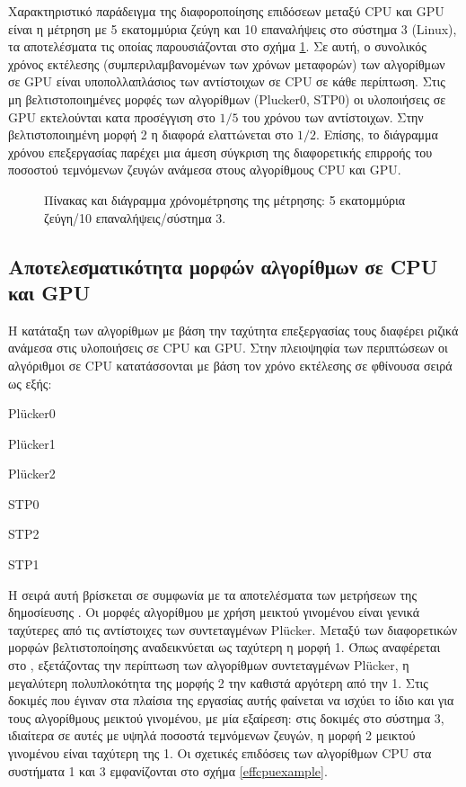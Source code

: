 Χαρακτηριστικό παράδειγμα της διαφοροποίησης επιδόσεων μεταξύ CPU και GPU είναι η μέτρηση με 5 εκατομμύρια ζεύγη και 10 επαναλήψεις στο σύστημα 3 (Linux), τα αποτελέσματα τις οποίας παρουσιάζονται στο σχήμα \ref{gpuexample}. Σε αυτή, ο συνολικός χρόνος εκτέλεσης (συμπεριλαμβανομένων των χρόνων μεταφορών) των αλγορίθμων σε GPU είναι υποπολλαπλάσιος των αντίστοιχων σε CPU σε κάθε περίπτωση. Στις μη βελτιστοποιημένες μορφές των αλγορίθμων (Plucker0, STP0) οι υλοποιήσεις σε GPU εκτελούνται κατα προσέγγιση στο $1/5$ του χρόνου των αντίστοιχων. Στην βελτιστοποιημένη μορφή 2 η διαφορά ελαττώνεται στο $1/2$. Επίσης, το διάγραμμα χρόνου επεξεργασίας παρέχει μια άμεση σύγκριση της διαφορετικής επιρροής του ποσοστού τεμνόμενων ζευγών ανάμεσα στους αλγορίθμους CPU και GPU.

\begin{figure}[b]
\begin{center}
\tabcolsep=0.11cm
\scalebox{0.6}{}
\scalebox{0.9}{
}\end{center}
\caption{Πίνακας και διάγραμμα χρόνομέτρησης της μέτρησης: 5 εκατομμύρια ζεύγη/10 επαναλήψεις/σύστημα 3.}
\label{gpuexample}
\end{figure}

\subsection{Αποτελεσματικότητα μορφών αλγορίθμων σε CPU και GPU}
\label{chapter:bench_algs}
\noindent Η κατάταξη των αλγορίθμων με βάση την ταχύτητα επεξεργασίας τους διαφέρει ριζικά ανάμεσα στις υλοποιήσεις σε CPU και GPU. Στην πλειοψηφία των περιπτώσεων οι αλγόριθμοι σε CPU κατατάσσονται με βάση τον χρόνο εκτέλεσης σε φθίνουσα σειρά ως εξής:

\begin{enumerate*}
\item Plücker0
\item Plücker1
\item Plücker2
\item STP0
\item STP2
\item STP1
\end{enumerate*}

Η σειρά αυτή βρίσκεται σε συμφωνία με τα αποτελέσματα των μετρήσεων της δημοσίευσης \cite{PlatisTheoharis03}. Οι μορφές αλγορίθμου με χρήση μεικτού γινομένου είναι γενικά ταχύτερες από τις αντίστοιχες των συντεταγμένων Plücker. Μεταξύ των διαφορετικών μορφών βελτιστοποίησης αναδεικνύεται ως ταχύτερη η μορφή 1. Όπως αναφέρεται στο \cite{PlatisTheoharis03}, εξετάζοντας την περίπτωση των αλγορίθμων συντεταγμένων Plücker, η μεγαλύτερη πολυπλοκότητα της μορφής 2 την καθιστά αργότερη από την 1. Στις δοκιμές που έγιναν στα πλαίσια της εργασίας αυτής φαίνεται να ισχύει το ίδιο και για τους αλγορίθμους μεικτού γινομένου, με μία εξαίρεση: στις δοκιμές στο σύστημα 3, ιδιαίτερα σε αυτές με υψηλά ποσοστά τεμνόμενων ζευγών, η μορφή 2 μεικτού γινομένου είναι ταχύτερη της 1. Οι σχετικές επιδόσεις των αλγορίθμων CPU στα συστήματα 1 και 3 εμφανίζονται στο σχήμα \ref{effcpuexample}.

